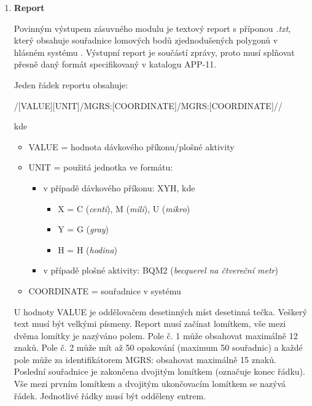 \begin{enumerate}
	\item \textbf{Report}

          Povinným výstupem zásuvného modulu je textový report s
          příponou \textit{.txt}, který obsahuje souřadnice lomových
          bodů zjednodušených polygonů v hlásném systému
          . Výstupní report je součástí  zprávy,
          proto musí splňovat přesně daný formát specifikovaný v
          katalogu APP-11.

\newpage
Jeden řádek reportu obsahuje:

/[VALUE][UNIT]/MGRS:[COORDINATE]/MGRS:[COORDINATE]//

kde
\begin{itemize}
			\item VALUE = hodnota dávkového příkonu/plošné aktivity 
			
			\item UNIT = použitá jednotka ve formátu:
			
			\begin{itemize}
				\item v případě dávkového příkonu: XYH, kde
			 		\begin{itemize}
						\item X = C (\textit{centi}), M (\textit{mili}), U (\textit{mikro})
						\item Y = G (\textit{gray})
						\item H = H (\textit{hodina})
					\end{itemize}
				\item v případě plošné aktivity: BQM2 (\textit{becquerel na čtvereční metr})
			\end{itemize}
			
			\item COORDINATE = souřadnice v systému 
\end{itemize}
				
U hodnoty VALUE je oddělovačem desetinných míst desetinná
tečka. Veškerý text musí být velkými písmeny. Report musí začínat
lomítkem, vše mezi dvěma lomítky je nazýváno polem. Pole č. 1 může
obsahovat maximálně 12 znaků. Pole č. 2 může mít až 50 opakování
(maximum 50 souřadnic) a každé pole může za identifikátorem MGRS:
obsahovat maximálně 15 znaků. Poslední souřadnice je zakončena
dvojitým lomítkem (označuje konec řádku). Vše mezi prvním lomítkem a
dvojitým ukončovacím lomítkem se nazývá řádek. Jednotlivé řádky musí
být odděleny entrem.


\end{enumerate}
